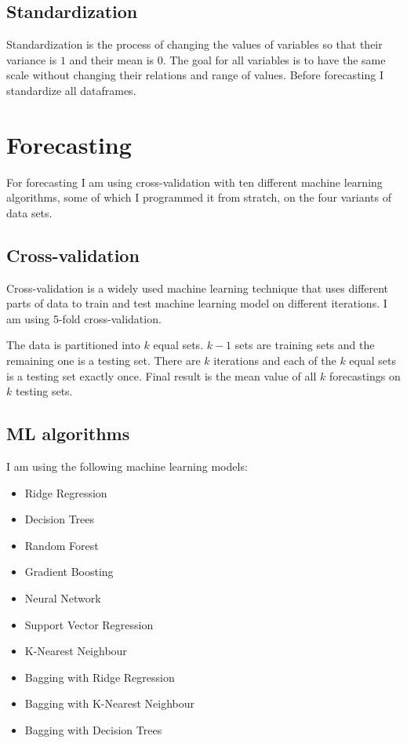 \documentclass[12pt]{article}
\begin{document}
	\subsection{Standardization}
	
	Standardization is the process of changing the values of variables so that their variance is $1$ and their mean is 0. The goal for all variables is to have the same scale without changing their relations and range of values. Before forecasting I standardize all dataframes.
	
	\section{Forecasting}
	
	For forecasting I am using cross-validation with ten different machine learning algorithms, some of which I programmed it from stratch, on the four variants of  data sets. 
	
	\subsection{Cross-validation}
	Cross-validation is a widely used machine learning technique that uses different parts of data to train and test machine learning model on different iterations. I am using 5-fold cross-validation.
	
	The data is partitioned into $k$ equal sets. $k-1$ sets are training sets and the remaining one is a testing set. There are $k$ iterations and each of the $k$ equal sets is a testing set exactly once. Final result is the mean value of all $k$ forecastings on $k$ testing sets.
	
	\subsection{ML algorithms}
	I am using the following machine learning models:
	\begin{itemize}
		\item Ridge Regression
		\item Decision Trees
		\item Random Forest
		\item Gradient Boosting
		\item Neural Network
		\item Support Vector Regression
		\item K-Nearest Neighbour
		\item Bagging with Ridge Regression
		\item Bagging with K-Nearest Neighbour
		\item Bagging with Decision Trees
	\end{itemize}
\end{document}
